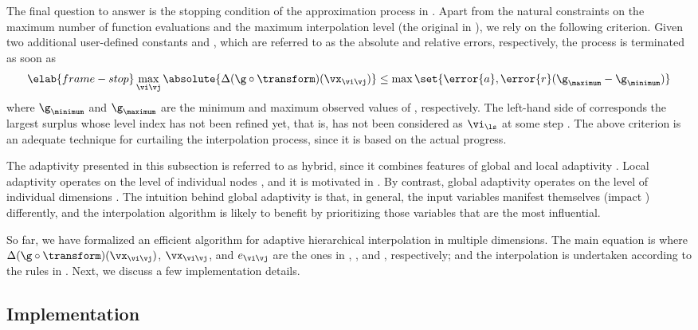 The final question to answer is the stopping condition of the approximation
process in . Apart from the natural constraints on the
maximum number of function evaluations and the maximum interpolation level (the
original \ls in ), we rely on the following
criterion. Given two additional user-defined constants  and ,
which are referred to as the absolute and relative errors, respectively, the
process is terminated as soon as
\begin{equation} \elab{frame-stop}
  \max_{\vi \vj} \absolute{\Delta(\g \circ \transform)(\vx_{\vi \vj})} \leq \max \set{\error{a}, \error{r} (\g_\maximum - \g_\minimum)}
\end{equation}
where $\g_\minimum$ and $\g_\maximum$ are the minimum and maximum observed
values of \g, respectively. The left-hand side of  corresponds
the largest surplus whose level index has not been refined yet, that is, has not
been considered as $\vi_{\ls}$ at some step \ls. The above criterion is an
adequate technique for curtailing the interpolation process, since it is based
on the actual progress.

The adaptivity presented in this subsection is referred to as hybrid, since it
combines features of global and local adaptivity \cite{jakeman2012}. Local
adaptivity operates on the level of individual nodes \cite{ma2009}, and it is
motivated in . By contrast, global adaptivity operates on
the level of individual dimensions \cite{klimke2006}. The intuition behind
global adaptivity is that, in general, the input variables manifest themselves
(impact \g) differently, and the interpolation algorithm is likely to benefit by
prioritizing those variables that are the most influential.

\conclusioncut
So far, we have formalized an efficient algorithm for adaptive hierarchical
interpolation in multiple dimensions. The main equation is
 where $\Delta(\g \circ \transform)(\vx_{\vi \vj})$,
$\vx_{\vi \vj}$, and $e_{\vi \vj}$ are the ones in
, , and ,
respectively; and the interpolation is undertaken according to the rules in
. Next, we discuss a few implementation details.

\subsection{Implementation}

